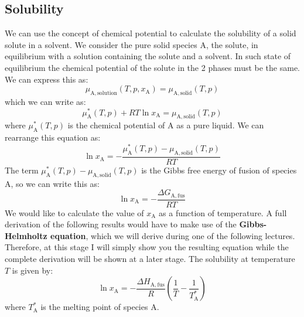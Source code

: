 \documentclass[12pt,a4paper]{report}
\begin{document}
  \subsection*{Solubility}
  We can use the concept of chemical potential to calculate the solubility of a solid solute in a solvent. We consider the pure solid species A, the solute, in equilibrium with a solution containing the solute and a solvent. In such state of equilibrium the chemical potential of the solute in the 2 phases must be the same. We can express this as:
   \begin{equation*}
   \mu_{\mathrm{A,solution}}(T,p,x_{\mathrm{A}}) = \mu_{\mathrm{A,solid}}(T,p)
   \end{equation*} 
   which we can write as:
   \begin{equation*}
   \mu^{*}_{\mathrm{A}}(T,p)+RT\ln x_{\mathrm{A}} = \mu_{\mathrm{A,solid}}(T,p)
   \end{equation*} 
   where $\mu^{*}_{\mathrm{A}}(T,p)$ is the chemical potential of A as a pure liquid. We can rearrange this equation as:
   \begin{equation*}
   \ln x_{\mathrm{A}} = -\frac{\mu^{*}_{\mathrm{A}}(T,p)-\mu_{\mathrm{A,solid}}(T,p)}{RT}
   \end{equation*} 
   The term $\mu^{*}_{\mathrm{A}}(T,p)-\mu_{\mathrm{A,solid}}(T,p)$ is the Gibbs free energy of fusion of species A, so we can write this as:
   \begin{equation*}
   \ln x_{\mathrm{A}} = -\frac{\Delta G_{\mathrm{A,fus}}}{RT}
   \end{equation*} 
   We would like to calculate the value of $x_{\mathrm{A}}$ as a function of temperature. A full derivation of the following results would have to make use of the \textbf{Gibbs-Helmholtz equation}, which we will derive during one of the following lectures. Therefore, at this stage I will simply show you the resulting equation while the complete derivation will be shown at a later stage. The solubility at temperature $T$ is given by:
   \begin{equation*}
   \ln x_{\mathrm{A}} = -\frac{\Delta H_{\mathrm{A,fus}}}{R}(\frac{1}{T}-\frac{1}{T^{*}_{\mathrm{A}}})
   \end{equation*}
where $T^{*}_{\mathrm{A}}$ is the melting point of species A.
\end{document}

